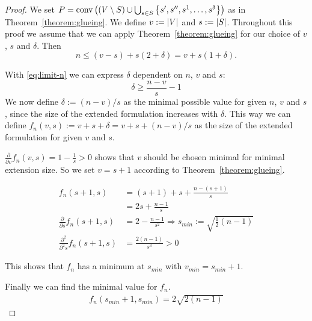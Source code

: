 \begin{proof}
  We set $P = \operatorname{conv}\left( (V \setminus S) \cup \bigcup_{s \in S} \left\{ s',s'',s^1,\dots,s^\delta \right\} \right)$ as in Theorem~\ref{theorem:glueing}. We define $v := \lvert V\rvert$ and $s := \lvert S\rvert$. Throughout this proof we assume that we can apply Theorem~\ref{theorem:glueing} for our choice of $v$, $s$ and $\delta$. Then
  \begin{equation}\label{eq:limit-n}
    n \leq (v-s) + s(2+\delta) = v + s(1+\delta).
  \end{equation}

  With \eqref{eq:limit-n} we can express $\delta$ dependent on $n$, $v$ and $s$:
  \begin{equation*}
    \delta \geq \frac{n-v}{s} - 1
  \end{equation*}
  We now define $\delta := (n-v)/s$ as the minimal possible value for given $n$, $v$ and $s$, since the size of the extended formulation increases with $\delta$. This way we can define $f_n(v,s) := v + s + \delta = v + s + (n-v)/s$ as the size of the extended formulation for given $v$ and $s$.

  $\frac{\partial}{\partial v} f_n(v,s) = 1 - \frac{1}{s} > 0$ shows that $v$ should be chosen minimal for minimal extension size. So we set $v = s+1$ according to Theorem~\ref{theorem:glueing}.

  \begin{align*}
    f_n(s+1, s) &= (s+1) + s + \frac{n-(s+1)}{s} \\
    &= 2s + \frac{n-1}{s}\\
    \frac{\partial}{\partial s} f_n(s+1,s) &= 2 - \frac{n-1}{s^2} \Rightarrow s_{min} := \sqrt{\frac{1}{2}(n-1)} \\
    \frac{\partial^2}{\partial^2 s} f_n(s+1,s) &= \frac{2(n-1)}{s^3} > 0
  \end{align*}
  
   This shows that $f_n$ has a minimum at $s_{min}$ with $v_{min}=s_{min}+1$.

  Finally we can find the minimal value for $f_n$.
  \begin{align*}
    f_n(s_{min}+1, s_{min}) = 2\sqrt{2(n-1)}
  \end{align*}
\end{proof}


